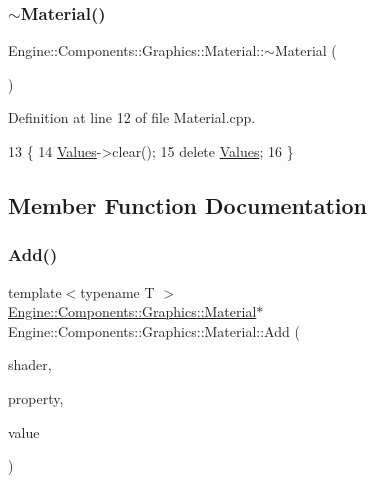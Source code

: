 \subsubsection{\texorpdfstring{$\sim$\+Material()}{~Material()}}
{\footnotesize\ttfamily Engine\+::\+Components\+::\+Graphics\+::\+Material\+::$\sim$\+Material (\begin{DoxyParamCaption}{ }\end{DoxyParamCaption})}



Definition at line 12 of file Material.\+cpp.


\begin{DoxyCode}
13 \{
14     \mbox{\hyperlink{classEngine_1_1Components_1_1Graphics_1_1Material_a34335608ba1e6eb2c2dba5032107eab0}{Values}}->clear();
15     \textcolor{keyword}{delete} \mbox{\hyperlink{classEngine_1_1Components_1_1Graphics_1_1Material_a34335608ba1e6eb2c2dba5032107eab0}{Values}};
16 \}
\end{DoxyCode}


\subsection{Member Function Documentation}
\mbox{\label{classEngine_1_1Components_1_1Graphics_1_1Material_aac7709d6bda9b0b16b771fa6530d140e}} 
\subsubsection{\texorpdfstring{Add()}{Add()}\hspace{0.1cm}{\footnotesize\ttfamily [1/2]}}
{\footnotesize\ttfamily template$<$typename T $>$ \\
\mbox{\hyperlink{classEngine_1_1Components_1_1Graphics_1_1Material}{Engine\+::\+Components\+::\+Graphics\+::\+Material}}$\ast$ Engine\+::\+Components\+::\+Graphics\+::\+Material\+::\+Add (\begin{DoxyParamCaption}\item[{\mbox{\hyperlink{classEngine_1_1Components_1_1Graphics_1_1Shader}{Shader}} $\ast$}]{shader,  }\item[{const G\+Lchar $\ast$}]{property,  }\item[{T $\ast$}]{value }\end{DoxyParamCaption})}



